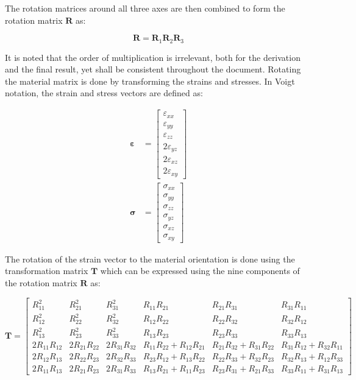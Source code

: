 The rotation matrices around all three axes are then combined to form the rotation matrix \(\mathbf{R}\) as:

\begin{equation}
\mathbf{R} = \mathbf{R}_1 \mathbf{R}_2 \mathbf{R}_3
\end{equation}

It is noted that the order of multiplication is irrelevant, both for the derivation and the final result, yet shall be consistent throughout the document.
Rotating the material matrix is done by transforming the strains and stresses. In Voigt notation, the strain and stress vectors are defined as:

\begin{align}
\mathbf{\varepsilon} &= \begin{bmatrix}
\varepsilon_{xx} \\
\varepsilon_{yy} \\
\varepsilon_{zz} \\
2\varepsilon_{yz} \\
2\varepsilon_{xz} \\
2\varepsilon_{xy}
\end{bmatrix} \\
\mathbf{\sigma} &= \begin{bmatrix}
\sigma_{xx} \\
\sigma_{yy} \\
\sigma_{zz} \\
\sigma_{yz} \\
\sigma_{xz} \\
\sigma_{xy}
\end{bmatrix}
\end{align}

The rotation of the strain vector to the material orientation is done using the transformation matrix \(\mathbf{T}\) which
can be expressed using the nine components of the rotation matrix \(\mathbf{R}\) as:

\begin{equation}
\mathbf{T} = \begin{bmatrix}
R_{11}^2 & R_{21}^2 & R_{31}^2 & R_{11} R_{21} & R_{21} R_{31} & R_{31} R_{11} \\
R_{12}^2 & R_{22}^2 & R_{32}^2 & R_{12} R_{22} & R_{22} R_{32} & R_{32} R_{12} \\
R_{13}^2 & R_{23}^2 & R_{33}^2 & R_{13} R_{23} & R_{23} R_{33} & R_{33} R_{13} \\
2 R_{11} R_{12} & 2 R_{21} R_{22} & 2 R_{31} R_{32} & R_{11} R_{22} + R_{12} R_{21} & R_{21} R_{32} + R_{31} R_{22} & R_{31} R_{12} + R_{32} R_{11} \\
2 R_{12} R_{13} & 2 R_{22} R_{23} & 2 R_{32} R_{33} & R_{23} R_{12} + R_{13} R_{22} & R_{22} R_{33} + R_{32} R_{23} & R_{32} R_{13} + R_{12} R_{33} \\
2 R_{11} R_{13} & 2 R_{21} R_{23} & 2 R_{31} R_{33} & R_{13} R_{21} + R_{11} R_{23} & R_{23} R_{31} + R_{21} R_{33} & R_{33} R_{11} + R_{31} R_{13}
\end{bmatrix}
\end{equation}

